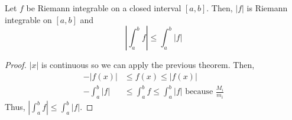 \begin{theorem}
    Let $f$ be Riemann integrable on a closed interval $[a, b]$. Then, $|f|$ is Riemann integrable on $[a, b]$ and $$\left|\int_a^b f\right| \leq \int_a^b \left|f\right|$$
\end{theorem}
\begin{proof}
    $|x|$ is continuous so we can apply the previous theorem. Then,
    \begin{align*}
        -|f(x)| &\leq f(x) \leq |f(x)| \\
        -\int_a^b |f| &\leq \int_a^b f \leq \int_a^b |f| \text{ because } \frac{M_i}{m_i}
    \end{align*}
    Thus, $\left|\int_a^b f\right| \leq \int_a^b \left|f\right|$.
\end{proof}